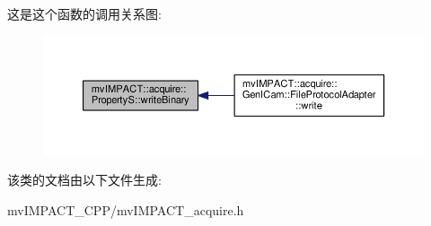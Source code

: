 这是这个函数的调用关系图\+:
\nopagebreak
\begin{figure}[H]
\begin{center}
\leavevmode
\includegraphics[width=350pt]{classmv_i_m_p_a_c_t_1_1acquire_1_1_property_s_ac08293bd5d249b57a66ea5d325c9a37a_icgraph}
\end{center}
\end{figure}




该类的文档由以下文件生成\+:\begin{DoxyCompactItemize}
\item 
mv\+I\+M\+P\+A\+C\+T\+\_\+\+C\+P\+P/mv\+I\+M\+P\+A\+C\+T\+\_\+acquire.\+h\end{DoxyCompactItemize}

